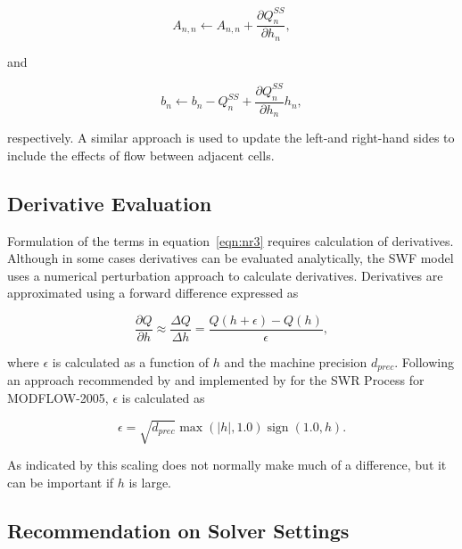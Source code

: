 \documentclass[fleqn]{article}
\DeclareMathOperator{\sign}{sign}
\begin{document}
\begin{equation}
\label{eqn:qssa}
A_{n,n} \leftarrow A_{n,n} + \frac{\partial Q_n^{SS}}{\partial h_n},
\end{equation}

\noindent and 

\begin{equation}
\label{eqn:qssb}
b_{n} \leftarrow b_{n} - Q_n^{SS} + \frac{\partial Q_n^{SS}}{\partial h_n} h_n,
\end{equation}

\noindent respectively.  A similar approach is used to update the left-and right-hand sides to include the effects of flow between adjacent cells.

\subsection{Derivative Evaluation}

Formulation of the terms in equation~\ref{eqn:nr3} requires calculation of derivatives.  Although in some cases derivatives can be evaluated analytically, the SWF model uses a numerical perturbation approach to calculate derivatives.  Derivatives are approximated using a forward difference expressed as

\begin{equation}
\label{eqn:derv}
\frac{\partial Q}{\partial h} \approx \frac{\Delta Q}{\Delta h} = \frac{Q \left ( h + \epsilon \right ) - Q \left ( h \right )}{\epsilon},
\end{equation}
  
\noindent where $\epsilon$ is calculated as a function of $h$ and the machine precision $d_{prec}$.  Following an approach recommended by \cite{kelley2003} and implemented by \cite{hughes2012documentation} for the SWR Process for MODFLOW-2005, $\epsilon$ is calculated as

\begin{equation}
\label{eqn:epsilon}
\epsilon = \sqrt{d_{prec}} \max(\left | h \right |, 1.0) \sign(1.0, h).
\end{equation}

\noindent As indicated by \cite{kelley2003} this scaling does not normally make much of a difference, but it can be important if $h$ is large.

\subsection{Recommendation on Solver Settings}
\end{document}
